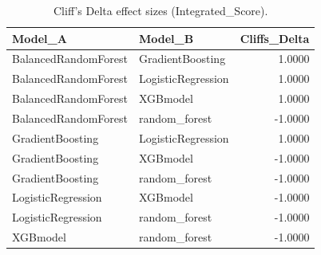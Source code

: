 \begin{table}[t]
\centering
\begin{tabular}{llr}
\toprule
Model_A & Model_B & Cliffs_Delta \\
\midrule
BalancedRandomForest & GradientBoosting & 1.0000 \\
BalancedRandomForest & LogisticRegression & 1.0000 \\
BalancedRandomForest & XGBmodel & 1.0000 \\
BalancedRandomForest & random_forest & -1.0000 \\
GradientBoosting & LogisticRegression & 1.0000 \\
GradientBoosting & XGBmodel & -1.0000 \\
GradientBoosting & random_forest & -1.0000 \\
LogisticRegression & XGBmodel & -1.0000 \\
LogisticRegression & random_forest & -1.0000 \\
XGBmodel & random_forest & -1.0000 \\
\bottomrule
\end{tabular}
\caption{Cliff's Delta effect sizes (Integrated_Score).}
\label{tab:cliffs_Integrated_Score}
\end{table}